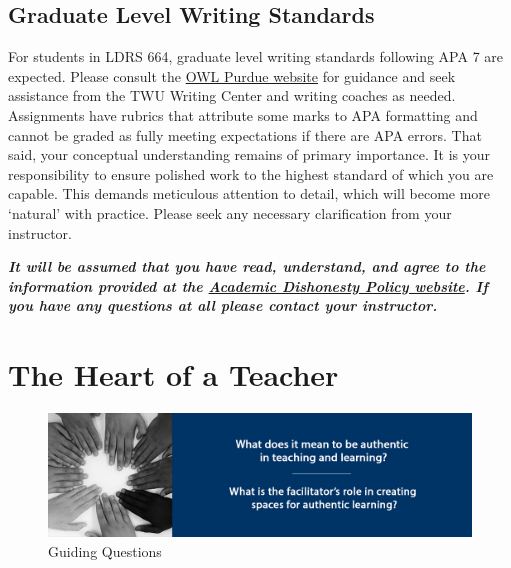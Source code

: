\documentclass[
]{book}
\begin{document}
\hypertarget{graduate-level-writing-standards}{%
\section*{Graduate Level Writing Standards}\label{graduate-level-writing-standards}}

For students in LDRS 664, graduate level writing standards following APA 7 are expected. Please consult the \href{https://owl.purdue.edu/owl/research_and_citation/apa_style/apa_style_introduction.html}{OWL Purdue website} for guidance and seek assistance from the TWU Writing Center and writing coaches as needed. Assignments have rubrics that attribute some marks to APA formatting and cannot be graded as fully meeting expectations if there are APA errors. That said, your conceptual understanding remains of primary importance. It is your responsibility to ensure polished work to the highest standard of which you are capable. This demands meticulous attention to detail, which will become more `natural' with practice. Please seek any necessary clarification from your instructor.

\begin{caution}
\textbf{\emph{It will be assumed that you have read, understand, and
agree to the information provided at the
\href{https://www.twu.ca/student-handbook/university-policies/academic-misconduct/procedures-dealing-acts-academic-0}{Academic
Dishonesty Policy website}. If you have any questions at all please
contact your instructor.}}
\end{caution}

\hypertarget{the-heart-of-a-teacher}{%
\chapter{The Heart of a Teacher}\label{the-heart-of-a-teacher}}

\begin{figure}
\centering
\includegraphics{assets/unit1/LDRS664-BannerUnit1.jpg}
\caption{Guiding Questions}
\end{figure}
\end{document}
